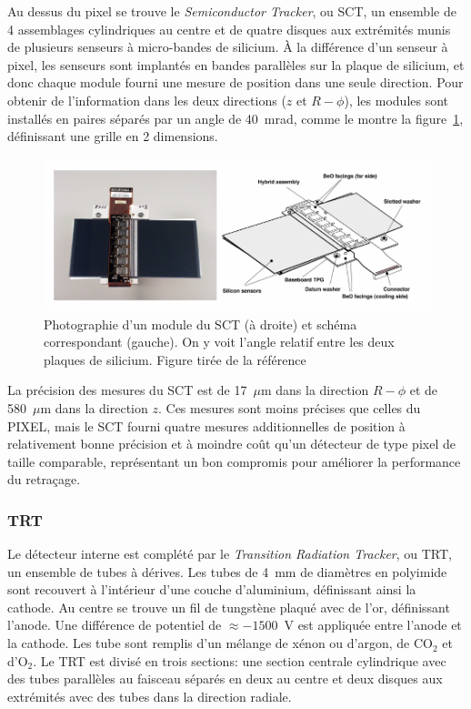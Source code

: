 Au dessus du pixel se trouve le \emph{Semiconductor Tracker}, ou SCT,
un ensemble de 4 assemblages cylindriques au centre et de quatre
disques aux extrémités munis de plusieurs senseurs à micro-bandes de
silicium. À la différence d'un senseur à pixel, les senseurs sont
implantés en bandes parallèles sur la plaque de silicium, et donc
chaque module fourni une mesure de position dans une seule
direction. Pour obtenir de l'information dans les deux directions ($z$
et $R-\phi$), les modules sont installés en paires séparés par un
angle de 40~mrad, comme le montre la figure~\ref{fig:sct}, définissant
une grille en 2 dimensions.

\begin{figure}[h]
  \centering
  \includegraphics{sct.pdf}
  \caption{Photographie d'un module du SCT (à droite) et schéma
    correspondant (gauche). On y voit l'angle relatif entre les deux
    plaques de silicium. Figure tirée de la
    référence~\cite{collaboration_atlas_2008}}
  \label{fig:sct}
\end{figure}

La précision des mesures du SCT est de 17~$\mu$m dans la direction
$R-\phi$ et de 580~$\mu$m dans la direction $z$. Ces mesures sont
moins précises que celles du PIXEL, mais le SCT fourni quatre mesures
additionnelles de position à relativement bonne précision et à moindre
coût qu'un détecteur de type pixel de taille comparable, représentant
un bon compromis pour améliorer la performance du retraçage.



\subsubsection{TRT}

Le détecteur interne est complété par le \emph{Transition Radiation
  Tracker}, ou TRT, un ensemble de tubes à dérives. Les tubes de 4~mm
de diamètres en polyimide sont recouvert à l'intérieur d'une couche
d'aluminium, définissant ainsi la cathode. Au centre se trouve un fil
de tungstène plaqué avec de l'or, définissant l'anode. Une différence
de potentiel de $\approx -1500$~V est appliquée entre l'anode et la
cathode. Les tube sont remplis d'un mélange de xénon ou d'argon, de
CO$_2$ et d'O$_2$. Le TRT est divisé en trois sections:
une section centrale cylindrique avec des tubes parallèles au faisceau
séparés en deux au centre et deux disques aux extrémités avec des
tubes dans la direction radiale.

